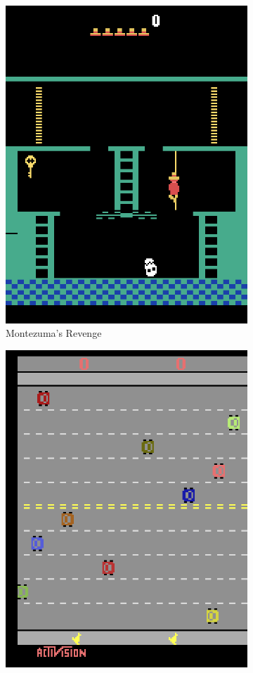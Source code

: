 \documentclass[draft,final]{vutinfth} %
\begin{document}
    \begin{figure}[h]
        \centering
        \begin{subfigure}{.3\textwidth}
            \centering
            \includegraphics[width=.8\linewidth]{figures/montezumarevenge.png}
            \caption{Montezuma's Revenge}
            \label{fig:mz}
        \end{subfigure}%
        \begin{subfigure}{.3\textwidth}
            \centering
            \includegraphics[width=.8\linewidth]{figures/freeway.png}

\end{subfigure}
\end{figure}
\end{document}
